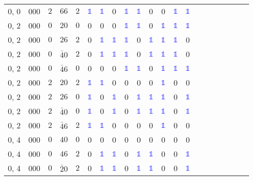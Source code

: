 \begin{longtable*}{c| cccccccccccccccccccc }
0, 0& 000& $2$& $66$& $2$& \textcolor{blue}{$\mathds{1}$}& \textcolor{blue}{$\mathds{1}$}& 0& \textcolor{blue}{$\mathds{1}$}& \textcolor{blue}{$\mathds{1}$}& 0& 0& \textcolor{blue}{$\mathds{1}$}& \textcolor{blue}{$\mathds{1}$}\\
0, 2& 000& $0$& $20$& $0$& 0& 0& 0& \textcolor{blue}{$\mathds{1}$}& \textcolor{blue}{$\mathds{1}$}& 0& \textcolor{blue}{$\mathds{1}$}& \textcolor{blue}{$\mathds{1}$}& \textcolor{blue}{$\mathds{1}$}\\
0, 2& 000& $0$& $26$& $2$& 0& \textcolor{blue}{$\mathds{1}$}& \textcolor{blue}{$\mathds{1}$}& \textcolor{blue}{$\mathds{1}$}& 0& \textcolor{blue}{$\mathds{1}$}& \textcolor{blue}{$\mathds{1}$}& \textcolor{blue}{$\mathds{1}$}& 0\\
0, 2& 000& $0$& $\bar{4}0$& $2$& 0& \textcolor{blue}{$\mathds{1}$}& \textcolor{blue}{$\mathds{1}$}& \textcolor{blue}{$\mathds{1}$}& 0& \textcolor{blue}{$\mathds{1}$}& \textcolor{blue}{$\mathds{1}$}& \textcolor{blue}{$\mathds{1}$}& 0\\
0, 2& 000& $0$& $\bar{4}6$& $0$& 0& 0& 0& \textcolor{blue}{$\mathds{1}$}& \textcolor{blue}{$\mathds{1}$}& 0& \textcolor{blue}{$\mathds{1}$}& \textcolor{blue}{$\mathds{1}$}& \textcolor{blue}{$\mathds{1}$}\\
0, 2& 000& $2$& $20$& $2$& \textcolor{blue}{$\mathds{1}$}& \textcolor{blue}{$\mathds{1}$}& 0& 0& 0& 0& \textcolor{blue}{$\mathds{1}$}& 0& 0\\
0, 2& 000& $2$& $26$& $0$& \textcolor{blue}{$\mathds{1}$}& 0& \textcolor{blue}{$\mathds{1}$}& 0& \textcolor{blue}{$\mathds{1}$}& \textcolor{blue}{$\mathds{1}$}& \textcolor{blue}{$\mathds{1}$}& 0& \textcolor{blue}{$\mathds{1}$}\\
0, 2& 000& $2$& $\bar{4}0$& $0$& \textcolor{blue}{$\mathds{1}$}& 0& \textcolor{blue}{$\mathds{1}$}& 0& \textcolor{blue}{$\mathds{1}$}& \textcolor{blue}{$\mathds{1}$}& \textcolor{blue}{$\mathds{1}$}& 0& \textcolor{blue}{$\mathds{1}$}\\
0, 2& 000& $2$& $\bar{4}6$& $2$& \textcolor{blue}{$\mathds{1}$}& \textcolor{blue}{$\mathds{1}$}& 0& 0& 0& 0& \textcolor{blue}{$\mathds{1}$}& 0& 0\\
0, 4& 000& $0$& $40$& $0$& 0& 0& 0& 0& 0& 0& 0& 0& 0\\
0, 4& 000& $0$& $46$& $2$& 0& \textcolor{blue}{$\mathds{1}$}& \textcolor{blue}{$\mathds{1}$}& 0& \textcolor{blue}{$\mathds{1}$}& \textcolor{blue}{$\mathds{1}$}& 0& 0& \textcolor{blue}{$\mathds{1}$}\\
0, 4& 000& $0$& $\bar{2}0$& $2$& 0& \textcolor{blue}{$\mathds{1}$}& \textcolor{blue}{$\mathds{1}$}& 0& \textcolor{blue}{$\mathds{1}$}& \textcolor{blue}{$\mathds{1}$}& 0& 0& \textcolor{blue}{$\mathds{1}$}\\

\end{longtable*}

